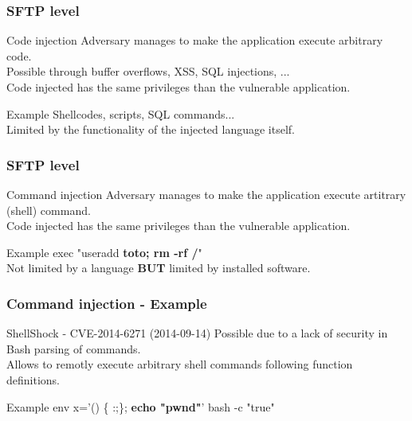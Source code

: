 \documentclass{beamer}
\begin{document}
\begin{frame}
    \frametitle{SFTP level}

    \begin{block}{Code injection}
        Adversary manages to make the application execute arbitrary code.\\
        Possible through buffer overflows, XSS, SQL injections, ...\\
        Code injected has the same privileges than the vulnerable application.
    \end{block}
    \vfill
    \begin{block}{Example}
	    Shellcodes, scripts, SQL commands...\\
    	Limited by the functionality of the injected language itself.
    \end{block}
\end{frame}

\begin{frame}
    \frametitle{SFTP level}

    \begin{block}{Command injection}
        Adversary manages to make the application execute artitrary (shell) command.\\
        Code injected has the same privileges than the vulnerable application.
    \end{block}
    \vfill
    \begin{block}{Example}
        exec "useradd {\bf toto; rm -rf /}"\\
        Not limited by a language {\bf BUT} limited by installed software.
    \end{block}
\end{frame}

\begin{frame}
    \frametitle{Command injection - Example}

    \begin{block}{ShellShock - CVE-2014-6271 (2014-09-14)}
        Possible due to a lack of security in Bash parsing of commands.\\
        Allows to remotly execute arbitrary shell commands following function definitions.
    \end{block}
    \vfill
    \begin{block}{Example}
        env x='() \{ :;\}; {\bf echo "pwnd"}' bash -c "true"
    \end{block}
\end{frame}
\end{document}
